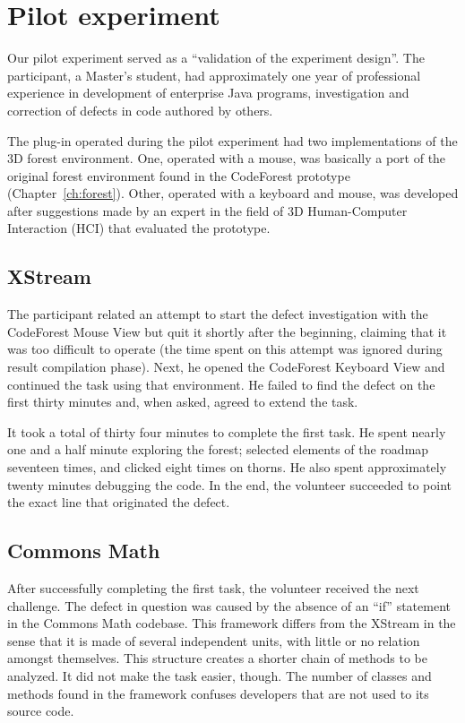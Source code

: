 \section{Pilot experiment}

Our pilot experiment served as a ``validation of the experiment design''.
The participant, a Master's student, had approximately one year of professional
experience in development of enterprise Java programs, investigation and
correction of defects in code authored by others.

The plug-in operated during the pilot experiment had two implementations of the
3D forest environment. One, operated with a mouse, was basically a port of the
original forest environment found in the CodeForest prototype
(Chapter~\ref{ch:forest}).
Other, operated with a keyboard and mouse, was developed after suggestions made
by an expert in the field of 3D Human-Computer Interaction (HCI) that evaluated
the prototype.

\subsection{XStream}

The participant related an attempt to start the defect investigation with the
CodeForest Mouse View but quit it shortly after the beginning, claiming
that it was too difficult to operate (the time spent on this attempt was
ignored during result compilation phase). Next, he opened the CodeForest
Keyboard View and continued the task using that environment. He failed to
find the defect on the first thirty minutes and, when asked, agreed to
extend the task.

It took a total of thirty four minutes to complete the first task. He spent
nearly one and a half minute exploring the forest; selected elements of the
roadmap seventeen times, and clicked eight times on thorns. He also spent
approximately twenty minutes debugging the code. In the end, the volunteer
succeeded to point the exact line that originated the defect.

\subsection{Commons Math}

After successfully completing the first task, the volunteer received the next
challenge. The defect in question was caused by the absence of an ``if''
statement in the Commons Math codebase. This framework differs from the XStream
in the sense that it is made of several independent units, with little or no
relation amongst themselves. This structure creates a shorter chain of methods
to be analyzed. It did not make the task easier, though. The number of classes
and methods found in the framework confuses developers that are not used to its
source code.

